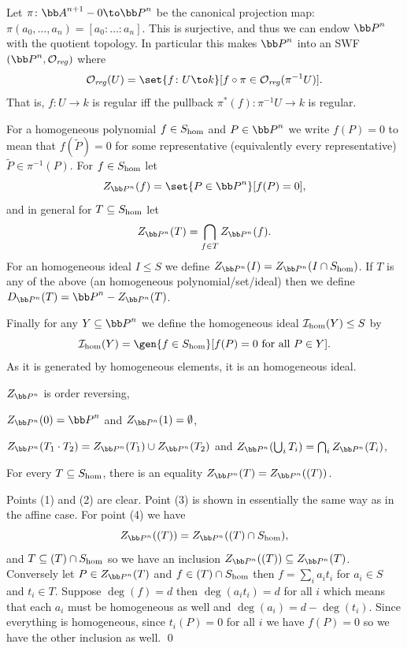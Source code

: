 Let $\pi\colon\bA^{n+1}-0\to\bP^n$ be the canonical projection map: $\pi(a_0,\dots,a_n)=[a_0:\dots:a_n]$.
This is surjective, and thus we can endow $\bP^n$ with the quotient topology.
In particular this makes $\bP^n$ into an SWF $(\bP^n,\O_\reg)$ where
$$ \O_\reg(U) = \set{f\colon U\to k}[f\circ\pi\in\O_\reg(\pi^{-1}U)] . $$
That is, $f\colon U\to k$ is regular iff the pullback $\pi^*(f)\colon\pi^{-1}U\to k$ is regular.

\bdefn

    For a homogeneous polynomial $f\in S_{\rm hom}$ and $P\in\bP^n$ we write $f(P)=0$ to mean that $f(\tilde P)=0$ for some representative (equivalently every representative) $\tilde P\in\pi^{-1}(P)$.
    For $f\in S_{\rm hom}$ let
    $$ Z_{\bP^n}(f) = \set{P\in\bP^n}[f(P)=0] , $$
    and in general for $T\subseteq S_{\rm hom}$ let
    $$ Z_{\bP^n}(T) = \bigcap_{f\in T}Z_{\bP^n}(f) . $$
    For an homogeneous ideal $I\leq S$ we define $Z_{\bP^n}(I)=Z_{\bP^n}(I\cap S_\homo)$.
    If $T$ is any of the above (an homogeneous polynomial/set/ideal) then we define $D_{\bP^n}(T)=\bP^n-Z_{\bP^n}(T)$.

    Finally for any $Y\subseteq\bP^n$ we define the homogeneous ideal ${{\cal I}}_{\rm hom}(Y)\leq S$ by
    $$ \I_\homo(Y) = \gen{f\in S_\homo}[\hbox{$f(P)=0$ for all $P\in Y$}] . $$
    As it is generated by homogeneous elements, it is an homogeneous ideal.

\edefn

\blemm

    \benum
        \item $Z_{\bP^n}$ is order reversing,
        \item $Z_{\bP^n}(0)=\bP^n$ and $Z_{\bP^n}(1)=\emptyset$,
        \item $Z_{\bP^n}(T_1\cdot T_2)=Z_{\bP^n}(T_1)\cup Z_{\bP^n}(T_2)$ and $Z_{\bP^n}\parens{\bigcup_iT_i}=\bigcap_iZ_{\bP^n}(T_i)$,
        \item For every $T\subseteq S_{\rm hom}$, there is an equality $Z_{\bP^n}(T)=Z_{\bP^n}((T))$.
    \eenum

\elemm

\bproof

    Points (1) and (2) are clear.
    Point (3) is shown in essentially the same way as in the affine case.
    For point (4) we have
    $$ Z_{\bP^n}((T)) = Z_{\bP^n}((T)\cap S_\homo) , $$
    and $T\subseteq(T)\cap S_{\rm hom}$ so we have an inclusion $Z_{\bP^n}((T))\subseteq Z_{\bP^n}(T)$.
    Conversely let $P\in Z_{\bP^n}(T)$ and $f\in(T)\cap S_{\rm hom}$ then $f=\sum_ia_it_i$ for $a_i\in S$ and $t_i\in T$.
    Suppose $\deg(f)=d$ then $\deg(a_it_i)=d$ for all $i$ which means that each $a_i$ must be homogeneous as well and $\deg(a_i)=d-\deg(t_i)$.
    Since everything is homogeneous, since $t_i(P)=0$ for all $i$ we have $f(P)=0$ so we have the other inclusion as well.
    \qed

